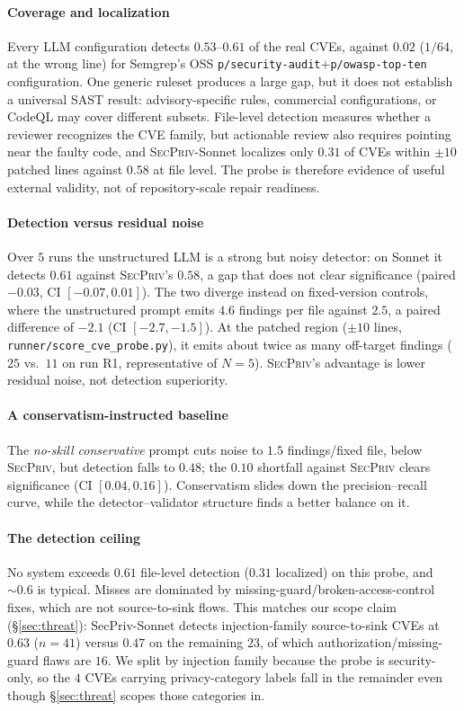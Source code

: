 \documentclass[runningheads]{llncs}
\begin{document}
\paragraph{Coverage and localization} Every LLM configuration detects $0.53$--$0.61$ of the real CVEs, against $0.02$ ($1/64$, at the wrong line) for Semgrep's OSS \texttt{p/security-audit}$+$\texttt{p/owasp-top-ten} configuration. One generic ruleset produces a large gap, but it does not establish a universal SAST result: advisory-specific rules, commercial configurations, or CodeQL may cover different subsets. File-level detection measures whether a reviewer recognizes the CVE family, but actionable review also requires pointing near the faulty code, and \textsc{SecPriv}-Sonnet localizes only $0.31$ of CVEs within $\pm 10$ patched lines against $0.58$ at file level. The probe is therefore evidence of useful external validity, not of repository-scale repair readiness.

\paragraph{Detection versus residual noise} Over $5$ runs the unstructured LLM is a strong but noisy detector: on Sonnet it detects $0.61$ against \textsc{SecPriv}'s $0.58$, a gap that does not clear significance (paired $-0.03$, CI $[-0.07,0.01]$). The two diverge instead on fixed-version controls, where the unstructured prompt emits $4.6$ findings per file against $2.5$, a paired difference of $-2.1$ (CI $[-2.7,-1.5]$). At the patched region ($\pm 10$ lines, \texttt{runner/score\_cve\_probe.py}), it emits about twice as many off-target findings ($25$ vs.\ $11$ on run R1, representative of $N{=}5$). \textsc{SecPriv}'s advantage is lower residual noise, not detection superiority.

\paragraph{A conservatism-instructed baseline} The \emph{no-skill conservative} prompt cuts noise to $1.5$ findings/fixed file, below \textsc{SecPriv}, but detection falls to $0.48$; the $0.10$ shortfall against \textsc{SecPriv} clears significance (CI $[0.04,0.16]$). Conservatism slides down the precision--recall curve, while the detector--validator structure finds a better balance on it.

\paragraph{The detection ceiling} No system exceeds $0.61$ file-level detection ($0.31$ localized) on this probe, and $\sim\!0.6$ is typical. Misses are dominated by missing-guard/broken-access-control fixes, which are not source-to-sink flows. This matches our scope claim (\S\ref{sec:threat}): SecPriv-Sonnet detects injection-family source-to-sink CVEs at $0.63$ ($n{=}41$) versus $0.47$ on the remaining $23$, of which authorization/missing-guard flaws are $16$. We split by injection family because the probe is security-only, so the $4$ CVEs carrying privacy-category labels fall in the remainder even though \S\ref{sec:threat} scopes those categories in.
\end{document}
